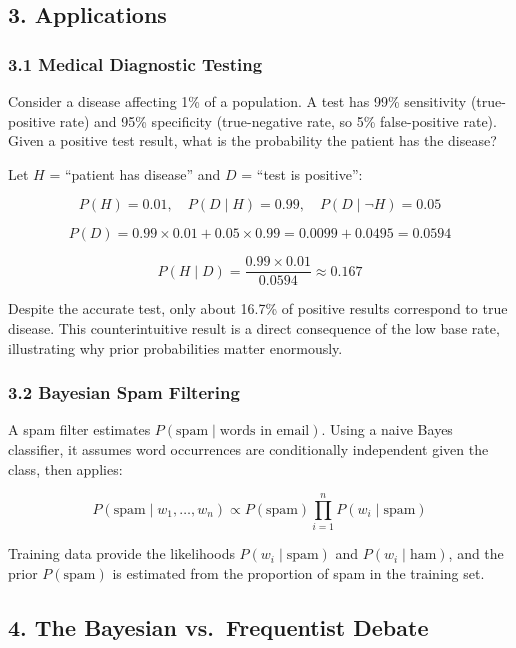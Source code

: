 \documentclass[
]{article}
\begin{document}
\hypertarget{applications}{%
\subsection{3. Applications}\label{applications}}

\hypertarget{medical-diagnostic-testing}{%
\subsubsection{3.1 Medical Diagnostic
Testing}\label{medical-diagnostic-testing}}

Consider a disease affecting 1\% of a population. A test has 99\%
sensitivity (true-positive rate) and 95\% specificity (true-negative
rate, so 5\% false-positive rate). Given a positive test result, what is
the probability the patient has the disease?

Let \(H\) = ``patient has disease'' and \(D\) = ``test is positive'':

\[P(H) = 0.01, \quad P(D \mid H) = 0.99, \quad P(D \mid \neg H) = 0.05\]

\[P(D) = 0.99 \times 0.01 + 0.05 \times 0.99 = 0.0099 + 0.0495 = 0.0594\]

\[P(H \mid D) = \frac{0.99 \times 0.01}{0.0594} \approx 0.167\]

Despite the accurate test, only about 16.7\% of positive results
correspond to true disease. This counterintuitive result is a direct
consequence of the low base rate, illustrating why prior probabilities
matter enormously.

\hypertarget{bayesian-spam-filtering}{%
\subsubsection{3.2 Bayesian Spam
Filtering}\label{bayesian-spam-filtering}}

A spam filter estimates \(P(\text{spam} \mid \text{words in email})\).
Using a naive Bayes classifier, it assumes word occurrences are
conditionally independent given the class, then applies:

\[P(\text{spam} \mid w_1, \ldots, w_n) \propto P(\text{spam})\prod_{i=1}^{n}P(w_i \mid \text{spam})\]

Training data provide the likelihoods \(P(w_i \mid \text{spam})\) and
\(P(w_i \mid \text{ham})\), and the prior \(P(\text{spam})\) is
estimated from the proportion of spam in the training set.

\hypertarget{the-bayesian-vs.-frequentist-debate}{%
\subsection{4. The Bayesian vs.~Frequentist
Debate}\label{the-bayesian-vs.-frequentist-debate}}
\end{document}
